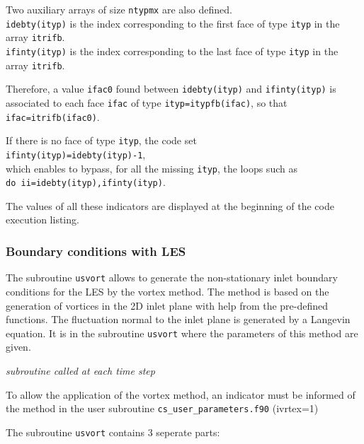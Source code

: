 {{{Two auxiliary arrays of size \texttt{ntypmx} are also defined.\\
\texttt{idebty(ityp)} is the index
corresponding to the first
face of type \texttt{ityp} in the array \texttt{itrifb}.\\
\texttt{ifinty(ityp)} is the index
corresponding to the last
face of type \texttt{ityp} in the array \texttt{itrifb}.

Therefore, a value \texttt{ifac0} found between \texttt{idebty(ityp)} and
\texttt{ifinty(ityp)} is associated to each face \texttt{ifac} of type
\texttt{ityp=itypfb(ifac)}, so that \texttt{ifac=itrifb(ifac0)}.

If there is no face of type \texttt{ityp}, the code set \\
\texttt{ifinty(ityp)=idebty(ityp)-1},\\
which enables to bypass, for all the missing \texttt{ityp}, the loops such as \\
\texttt{do ii=idebty(ityp),ifinty(ityp)}.

The values of all these indicators are displayed at the beginning of the
code execution listing.

\subsubsection[Boundary conditions with LES]
{Boundary conditions with LES}
\label{sec:prg_usvort}%
The subroutine \texttt{usvort} allows to generate the non-stationary inlet boundary
conditions for the LES by the vortex method. The method is based on
 the generation of vortices in the 2D inlet plane with help from
the pre-defined functions. The fluctuation normal to the inlet plane
is generated by a Langevin equation. It is in the subroutine \texttt{usvort}
 where the parameters of this method are given.

\noindent
\textit{subroutine called at each time step}

To allow the application of the vortex method, an indicator must be informed of
the method in the user subroutine \texttt{cs\_user\_parameters.f90} (ivrtex=1)

The subroutine \texttt{usvort} contains 3 seperate parts:

}}}
